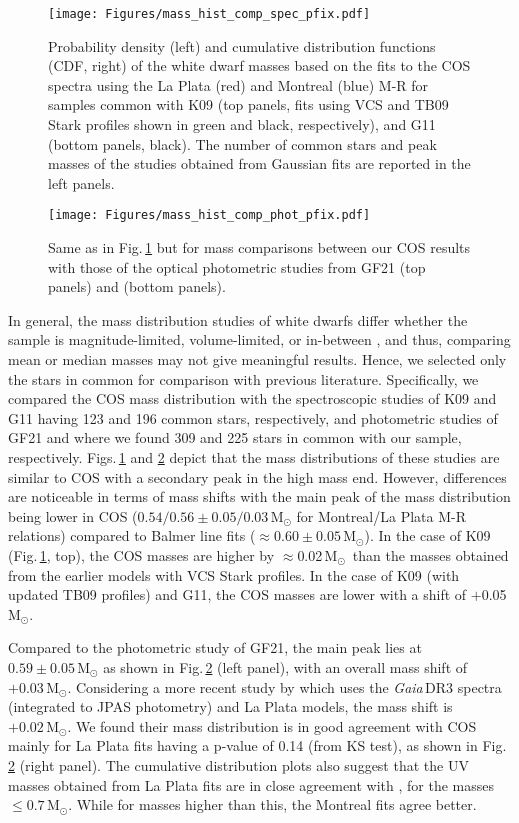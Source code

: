 \documentclass[fleqn,usenatbib, useAMS]{mnras}
\newcommand{\Msun}{\mbox{$\mathrm{M_\odot}$}}
\begin{document}
\begin{figure}
\centering
\texttt{[image: Figures/mass\_hist\_comp\_spec\_pfix.pdf]}
\caption{Probability density (left) and cumulative distribution functions (CDF, right) of the white dwarf masses based on the fits to the COS spectra using the La Plata (red) and Montreal (blue) M-R for samples common with K09 (top panels, fits using VCS and TB09 Stark profiles shown in green and black, respectively), and G11 (bottom panels, black). The number of common stars and peak masses of the studies obtained from Gaussian fits are reported in the left panels.} 
\label{fig:mass_wd_spec}
\end{figure}

\begin{figure}
\centering
\texttt{[image: Figures/mass\_hist\_comp\_phot\_pfix.pdf]}
\caption{Same as in Fig.\,\ref{fig:mass_wd_spec} but for mass comparisons between our COS results with those of the optical photometric studies from GF21 (top panels) and \citet{Esteban2022} (bottom panels).} 
\label{fig:mass_wd_phot}
\end{figure}

In general, the mass distribution studies of white dwarfs differ whether the sample is magnitude-limited, volume-limited, or in-between \citep{Tremblay2016}, and thus, comparing mean or median masses may not give meaningful results. Hence, we selected only the stars in common for comparison with previous literature. Specifically, we compared the COS mass distribution with the spectroscopic studies of K09 and G11 having 123 and 196 common stars, respectively, and photometric studies of GF21 and \cite{Esteban2022} where we found 309 and 225 stars in common with our sample, respectively. Figs.\,\ref{fig:mass_wd_spec} and \ref{fig:mass_wd_phot} depict that the mass distributions of these studies are similar to COS with a secondary peak in the high mass end. However, differences are noticeable in terms of mass shifts with the main peak of the mass distribution being lower in COS ($0.54/0.56\pm0.05/0.03\,\Msun$ for Montreal/La Plata M-R relations) compared to Balmer line fits ($\approx0.60\pm0.05\,\Msun$). In the case of K09 (Fig.\,\ref{fig:mass_wd_spec}, top), the COS masses are higher by $\approx$0.02\,\Msun\ than the masses obtained from the earlier models with VCS Stark profiles. In the case of K09 (with updated TB09 profiles) and G11, the COS masses are lower with a shift of $+$0.05\,\Msun.

Compared to the photometric study of GF21, the main peak lies at $0.59\pm0.05\,\Msun$ as shown in Fig.\,\ref{fig:mass_wd_phot} (left panel), with an overall mass shift of $+0.03\,\Msun$. Considering a more recent study by \cite{Esteban2022} which uses the \textit{Gaia}\,DR3 spectra (integrated to JPAS photometry) and La Plata models, the mass shift is $+0.02\,\Msun$. We found their mass distribution is in good agreement with COS mainly for La Plata fits having a p-value of 0.14 (from KS test), as shown in Fig.\,\ref{fig:mass_wd_phot} (right panel). The cumulative distribution plots also suggest that the UV masses obtained from La Plata fits are in close agreement with \cite{Esteban2022}, for the masses $\leq0.7\,\Msun$. While for masses higher than this, the Montreal fits agree better.
\end{document}
